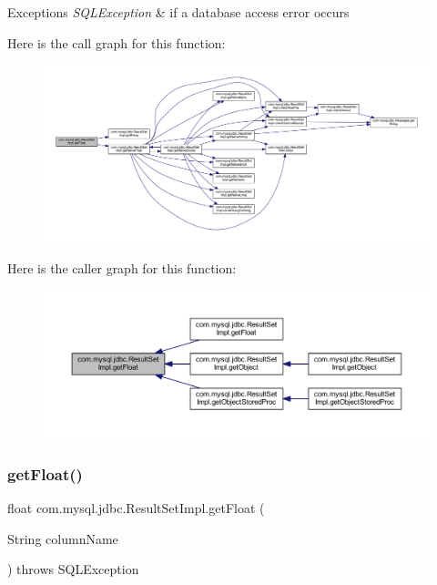 \begin{DoxyExceptions}{Exceptions}
{\em S\+Q\+L\+Exception} & if a database access error occurs \\
\hline
\end{DoxyExceptions}
Here is the call graph for this function\+:
\nopagebreak
\begin{figure}[H]
\begin{center}
\leavevmode
\includegraphics[width=350pt]{classcom_1_1mysql_1_1jdbc_1_1_result_set_impl_a1a4fb5819b39bf4594b05bdec4527df3_cgraph}
\end{center}
\end{figure}
Here is the caller graph for this function\+:
\nopagebreak
\begin{figure}[H]
\begin{center}
\leavevmode
\includegraphics[width=350pt]{classcom_1_1mysql_1_1jdbc_1_1_result_set_impl_a1a4fb5819b39bf4594b05bdec4527df3_icgraph}
\end{center}
\end{figure}
\mbox{\label{classcom_1_1mysql_1_1jdbc_1_1_result_set_impl_a3414afd7b9d00effb055ef1fbfd03183}} 
\subsubsection{\texorpdfstring{get\+Float()}{getFloat()}\hspace{0.1cm}{\footnotesize\ttfamily [2/2]}}
{\footnotesize\ttfamily float com.\+mysql.\+jdbc.\+Result\+Set\+Impl.\+get\+Float (\begin{DoxyParamCaption}\item[{String}]{column\+Name }\end{DoxyParamCaption}) throws S\+Q\+L\+Exception}


